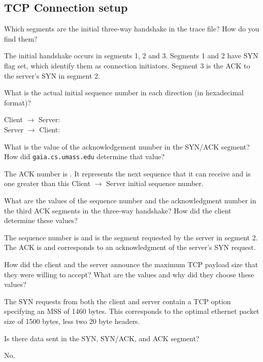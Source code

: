 \subsection{TCP Connection setup}
\begin{Question}
	Which segments are the initial three-way handshake in the trace file? How do you find them?
\end{Question}
\begin{Answer}
	The initial handshake occurs in segments 1, 2 and 3.
	Segments 1 and 2 have SYN flag set, which identify them as connection initiators.
	Segment 3 is the ACK to the server's SYN in segment 2.
\end{Answer}

\begin{Question}
	What is the actual initial sequence number in each direction (in hexadecimal format)?
\end{Question}
\begin{Answer}
	Client $\rightarrow$ Server: \\
	Server $\rightarrow$ Client: 
\end{Answer}

\begin{Question}
	What is the value of the acknowledgement number in the SYN/ACK segment? How did \texttt{gaia.cs.umass.edu} determine that value?
\end{Question}
\begin{Answer}
	The ACK number is .
	It represents the next sequence that it can receive and is one greater than this Client $\rightarrow$ Server initial sequence number.
\end{Answer}

\begin{Question}
	What are the values of the sequence number and the acknowledgment number in the third ACK segments in the three-way handshake? How did the client determine these values?
\end{Question}
\begin{Answer}
	The sequence number is  and is the segment requested by the server in segment 2.
	The ACK is  and corresponds to an acknowledgment of the server's SYN request.
\end{Answer}

\begin{Question}
	How did the client and the server announce the maximum TCP payload size that they were willing to accept? What are the values and why did they choose these values?
\end{Question}
\begin{Answer}
	The SYN requests from both the client and server contain a TCP option specifying an MSS of 1460 bytes.
	This corresponds to the optimal ethernet packet size of 1500 bytes, less two 20 byte headers.
\end{Answer}

\begin{Question}
	Is there data sent in the SYN, SYN/ACK, and ACK segment?
\end{Question}
\begin{Answer}
	No.
\end{Answer}
